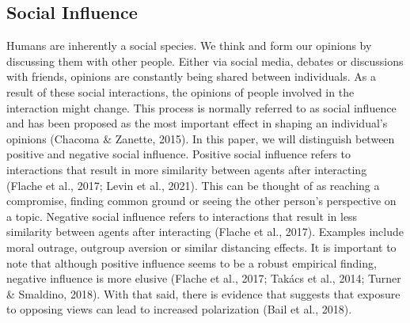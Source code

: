 \documentclass{article}
\begin{document}
\subsection{Social Influence}
Humans are inherently a social species. We think and form our opinions by discussing them with other people. Either via social media, debates or discussions with friends, opinions are constantly being shared between individuals. As a result of these social interactions, the opinions of people involved in the interaction might change. This process is normally referred to as social influence and has been proposed as the most important effect in shaping an individual’s opinions (Chacoma \& Zanette, 2015). In this paper, we will distinguish between positive and negative social influence. Positive social influence refers to interactions that result in more similarity between agents after interacting (Flache et al., 2017; Levin et al., 2021). This can be thought of as reaching a compromise, finding common ground or seeing the other person’s perspective on a topic. Negative social influence refers to interactions that result in less similarity between agents after interacting (Flache et al., 2017). Examples include moral outrage, outgroup aversion or similar distancing effects. It is important to note that although positive influence seems to be a robust empirical finding, negative influence is more elusive (Flache et al., 2017; Takács et al., 2014; Turner \& Smaldino, 2018). With that said, there is evidence that suggests that exposure to opposing views can lead to increased polarization (Bail et al., 2018).
\end{document}
